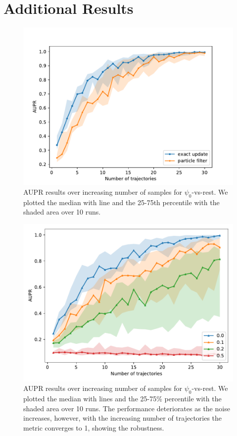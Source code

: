 \chapter{Additional Results}
\begin{figure}[H]
	\begin{center}
		\includegraphics[width=.75\textwidth]{figures/roc_analysis/AUPR_perc_0}
		\caption[AUPR results over increasing number of samples]{AUPR results over increasing number of samples for $ \psi_0 $-vs-rest. We plotted the median with line and the 25-75th percentile with the shaded area over 10 runs.}
		\label{fig:AUPR_class0}
	\end{center}
\end{figure}
\begin{figure}[H]
	\begin{center}
		\includegraphics[width=.75\textwidth]{figures/roc_analysis/error_AUPR_perc_0}
		\caption[AUPR results over increasing number of samples with different error probability $ p_e $]{AUPR results over increasing number of samples for $ \psi_0 $-vs-rest. We plotted the median with lines and the 25-75\% percentile with the shaded area over 10 runs. The performance deteriorates as the noise increases, however, with the increasing number of trajectories the metric converges to 1, showing the robustness.}
		\label{fig:AUPR_class0_error}
	\end{center}
\end{figure}

